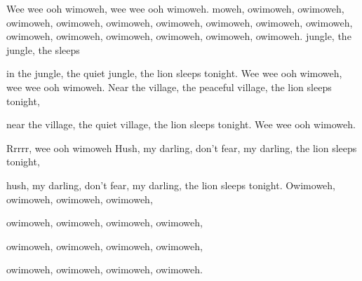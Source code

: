 
\zs
Wee wee ooh wimoweh,
wee wee ooh wimoweh.
\ks
\zr
{}moweh, owimoweh, owimoweh, owimoweh,
owimoweh, owimoweh, owimoweh, owimoweh,
\kr
\zr
owimoweh, owimoweh, owimoweh, owimoweh,
owimoweh, owimoweh, owimoweh, owimoweh.
\kr
\zs
{} jungle, the  jungle, the  sleeps 

in the jungle, the quiet jungle, the lion sleeps tonight.
\ks
\zr
Wee wee ooh wimoweh,
wee wee ooh wimoweh.
\kr
\zs
Near the village, the peaceful village, the lion sleeps tonight,

near the village, the quiet village, the lion sleeps tonight.
\ks
\zr
Wee wee ooh wimoweh.

Rrrrr, wee ooh wimoweh
\kr
\zs
Hush, my darling, don’t fear, my darling, the lion sleeps tonight,

hush, my darling, don’t fear, my darling, the lion sleeps tonight.
\ks
\zr
Owimoweh, owimoweh, owimoweh, owimoweh,

owimoweh, owimoweh, owimoweh, owimoweh,

owimoweh, owimoweh, owimoweh, owimoweh,

owimoweh, owimoweh, owimoweh, owimoweh.
\kr
\kp




